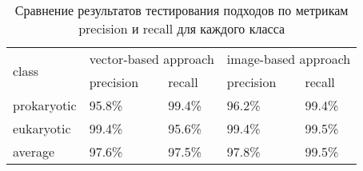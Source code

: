 \begin{table}[h]
\begin{tabular}{|l|l|l|l|l|}
\hline
\multirow{2}{*}{class} & \multicolumn{2}{l|}{vector-based approach} & \multicolumn{2}{l|}{image-based approach} \\ \cline{2-5} 
                       & precision             & recall             & precision             & recall            \\ \hline
prokaryotic            & 95.8\%                & 99.4\%             & 96.2\%                & 99.4\%            \\ \hline
eukaryotic             & 99.4\%                & 95.6\%             & 99.4\%                & 99.5\%            \\ \hline
average             & 97.6\%                & 97.5\%             & 97.8\%                & 99.5\%            \\ \hline
\end{tabular}
\caption{Сравнение результатов тестирования подходов по метрикам precision и recall для каждого класса}
\label{metrics_ep}
\end{table}